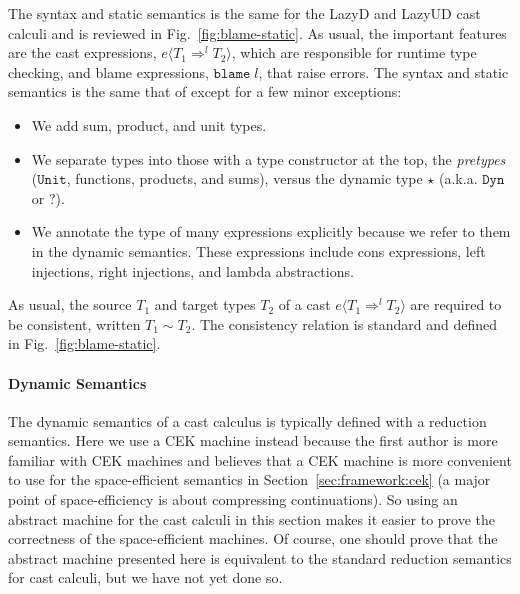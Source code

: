 \documentclass[acmsmall,review,anonymous]{acmart}\settopmatter{printfolios=true,printccs=false,printacmref=false}
\newcommand{\figref}[1]{Fig.~\ref{#1}}
\newcommand{\lazyUD}{Lazy\;UD}
\newcommand{\lazyD}{Lazy\;D}
\newcommand{\POOunit}[0]{\mathtt{Unit}}
\newcommand{\eOOcast}[4]{#1 \langle \cOOcast{#2}{#3}{#4} \rangle}
\newcommand{\eOOblame}[1]{\mathtt{blame} \; #1}
\newcommand{\cOOcast}[3]{#1 \Rightarrow^{#2} #3}
\begin{document}
The syntax and static semantics is the same for the \lazyD{} and
\lazyUD{} cast calculi and is reviewed in \figref{fig:blame-static}.
As usual, the important features are the cast expressions,
$\eOOcast{e}{T_1}{l}{T_2}$, which are responsible for runtime type
checking, and blame expressions, $\eOOblame{l}$, that raise errors.
The syntax and static semantics is the same that of
\citet{siek2009exploring} except for a few minor exceptions:
\begin{itemize}
\item We add sum, product, and unit types.
\item We separate types into those with a type constructor at the top,
  the \emph{pretypes} ($\POOunit$, functions, products, and sums),
  versus the dynamic type $\star$ (a.k.a. $\mathtt{Dyn}$ or
  $\mathbb{?}$).
\item We annotate the type of many expressions explicitly because we 
refer to them in the dynamic semantics. These expressions include cons 
expressions, left injections, right injections, and lambda abstractions.
\end{itemize}
As usual, the source $T_1$ and target types $T_2$ of a cast
$\eOOcast{e}{T_1}{l}{T_2}$ are required to be consistent, written $T_1
\sim T_2$. The consistency relation is standard and defined in
\figref{fig:blame-static}.

\paragraph{Dynamic Semantics}

The dynamic semantics of a cast calculus is typically defined with a
reduction semantics. Here we use a CEK machine
\citep{felleisen1986control} instead because the first author is more
familiar with CEK machines and believes that a CEK machine is more
convenient to use for the space-efficient semantics in
Section~\ref{sec:framework:cek} (a major point of space-efficiency is about 
compressing continuations). So using an abstract machine for the cast calculi in
this section makes it easier to prove the correctness of the space-efficient
machines. Of course, one should prove that the abstract machine
presented here is equivalent to the standard reduction semantics for
cast calculi, but we have not yet done so.
\end{document}

